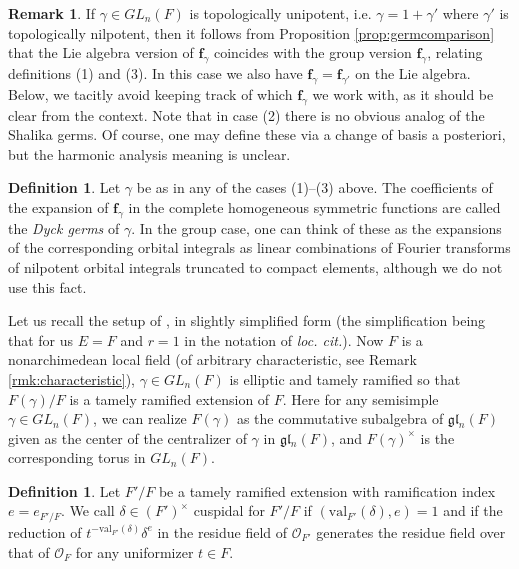 \documentclass{amsart}
\numberwithin{equation}{section}
\theoremstyle{definition}
\newtheorem{remark}[lemma]{Remark}%
\newtheorem{definition}[lemma]{Definition}%
\newcommand{\fgamma}{\mathbf{f}_{\gamma}}
\newcommand{\cO}{\mathcal{O}}
\newcommand{\fl}{\mathfrak{l}}
\newcommand{\fg}{\mathfrak{g}}
\begin{document}
\begin{remark}
If $\gamma\in GL_n(F)$ is topologically unipotent, i.e. $\gamma=1+\gamma'$ where $\gamma'$ is topologically nilpotent, then it follows from Proposition \ref{prop:germcomparison} that the Lie algebra version of $\fgamma$ coincides with the group version $\fgamma$, relating definitions (1) and (3). In this case we also have $\fgamma=\mathbf{f}_{\gamma'}$ on the Lie algebra. Below, we tacitly avoid keeping track of which $\fgamma$ we work with, as it should be clear from the context. Note that in case (2) there is no obvious analog of the Shalika germs. Of course, one may define these via a change of basis a posteriori, but the harmonic analysis meaning is unclear.
\end{remark}
\begin{definition}
\label{def:dyckgerms}
Let $\gamma$ be as in any of the cases (1)--(3) above. The coefficients of the expansion of $\fgamma$ in the complete homogeneous symmetric functions are called the {\em Dyck germs} of $\gamma$. In the group case, one can think of these as the expansions of the corresponding orbital integrals as linear combinations of Fourier transforms of nilpotent orbital integrals truncated to compact elements, although we do not use this fact.  %
\end{definition}

Let us recall the setup of \cite[S\'ection VI--VII]{W2}, in slightly simplified form (the simplification being that for us $E=F$ and $r=1$ in the notation of {\em loc. cit.}). Now $F$ is a nonarchimedean local field (of arbitrary characteristic, see Remark \ref{rmk:characteristic}), $\gamma\in GL_n(F)$ is elliptic and tamely ramified so that
$F(\gamma)/F$ is a tamely ramified extension of $F$. Here for any semisimple $\gamma\in GL_n(F)$, we can realize $F(\gamma)$ as the commutative subalgebra of $\fg\fl_n(F)$ given as the center of the centralizer of $\gamma$ in $\fg\fl_n(F)$, and $F(\gamma)^{\times}$ is the corresponding torus in $GL_n(F)$. %
\begin{definition}
\label{def:fcuspidal}
Let $F'/F$ be a tamely ramified extension with ramification index $e=e_{F'/F}$. We call $\delta\in (F')^\times$ cuspidal for $F'/F$ if $(\text{val}_{F'}(\delta),e)=1$ and if the reduction of $t^{-\text{val}_{F'}(\delta)}\delta^e$ in the residue field of $\cO_{F'}$ generates the residue field over that of $\cO_F$ for any uniformizer $t\in F$.
\end{definition}    
\end{document}
